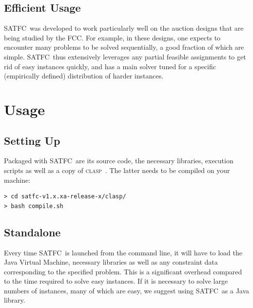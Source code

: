 \documentclass[
10pt, %
letterpaper, %
oneside, %
headinclude,footinclude, %
BCOR5mm, %
needspace, %
]{scrartcl}
\newcommand{\SATFC}{\textsc{SATFC}~}
\newcommand{\clasp}{\textsc{clasp}~}
\begin{document}
\subsection{Efficient Usage}
\SATFC was developed to work particularly well on the auction designs that are being studied by the FCC. For example, in these designs, one expects to encounter many problems to be solved sequentially, a good fraction of which are simple. \SATFC thus extensively leverages any partial feasible assignments to get rid of easy instances quickly, and has a main solver tuned for a specific (empirically defined) distribution of harder instances.

\section{Usage}\label{sec:usage}

\subsection{Setting Up}

Packaged with \SATFC are its source code, the necessary libraries, execution scripts as well as a copy of \clasp. The latter needs to be compiled on your machine:

\begin{lstlisting}[style=Bash]
> cd satfc-v1.x.xa-release-x/clasp/
> bash compile.sh
\end{lstlisting}

\subsection{Standalone}\label{sec:standalone}

\begin{fwarning}
Every time \SATFC is launched from the command line, it will have to load the Java Virtual Machine, necessary libraries as well as any constraint data corresponding to the specified problem. This is a significant overhead compared to the time required to solve easy instances. If it is necessary to solve large numbers of instances, many of which are easy, we suggest using \SATFC as a Java library.
\end{fwarning}
\end{document}

